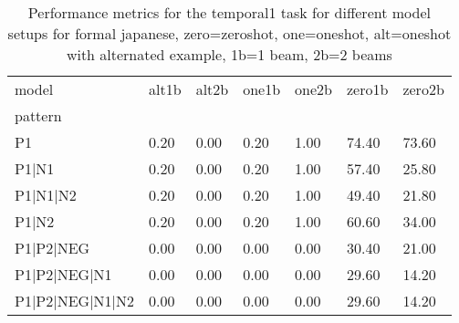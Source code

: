 \begin{table}[h]
\begin{tabular}{l|llllll}
\toprule
model & alt1b & alt2b & one1b & one2b & zero1b & zero2b \\
pattern &  &  &  &  &  &  \\
\midrule
P1 & 0.20 & 0.00 & 0.20 & 1.00 & 74.40 & 73.60 \\
P1|N1 & 0.20 & 0.00 & 0.20 & 1.00 & 57.40 & 25.80 \\
P1|N1|N2 & 0.20 & 0.00 & 0.20 & 1.00 & 49.40 & 21.80 \\
P1|N2 & 0.20 & 0.00 & 0.20 & 1.00 & 60.60 & 34.00 \\
P1|P2|NEG & 0.00 & 0.00 & 0.00 & 0.00 & 30.40 & 21.00 \\
P1|P2|NEG|N1 & 0.00 & 0.00 & 0.00 & 0.00 & 29.60 & 14.20 \\
P1|P2|NEG|N1|N2 & 0.00 & 0.00 & 0.00 & 0.00 & 29.60 & 14.20 \\
\bottomrule
\end{tabular}
\caption{Performance metrics for the temporal1 task for different model setups for formal japanese, zero=zeroshot, one=oneshot, alt=oneshot with alternated example, 1b=1 beam, 2b=2 beams}
\label{tab:ja form_temporal1_performance}
\end{table}

